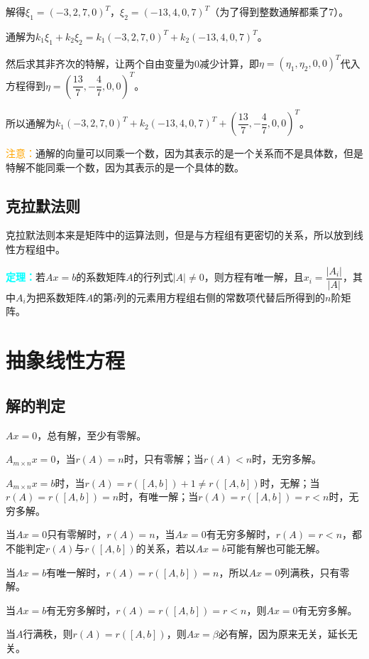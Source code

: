 \documentclass[UTF8, 12pt]{ctexart}
\begin{document}
解得$\xi_1=(-3,2,7,0)^T$，$\xi_2=(-13,4,0,7)^T$（为了得到整数通解都乘了7）。

通解为$k_1\xi_1+k_2\xi_2=k_1(-3,2,7,0)^T+k_2(-13,4,0,7)^T$。

然后求其非齐次的特解，让两个自由变量为0减少计算，即$\eta=(\eta_1,\eta_2,0,0)^T$代入方程得到$\eta=\left(\dfrac{13}{7},-\dfrac{4}{7},0,0\right)^T$。

所以通解为$k_1(-3,2,7,0)^T+k_2(-13,4,0,7)^T+\left(\dfrac{13}{7},-\dfrac{4}{7},0,0\right)^T$。

\textcolor{orange}{注意：}通解的向量可以同乘一个数，因为其表示的是一个关系而不是具体数，但是特解不能同乘一个数，因为其表示的是一个具体的数。

\subsection{克拉默法则}

克拉默法则本来是矩阵中的运算法则，但是与方程组有更密切的关系，所以放到线性方程组中。

\textcolor{aqua}{\textbf{定理：}}若$Ax=b$的系数矩阵$A$的行列式$\vert A\vert\neq0$，则方程有唯一解，且$x_i=\dfrac{\vert A_i\vert}{\vert A\vert}$，其中$A_i$为把系数矩阵$A$的第$i$列的元素用方程组右侧的常数项代替后所得到的$n$阶矩阵。

\section{抽象线性方程}

\subsection{解的判定}

$Ax=0$，总有解，至少有零解。

$A_{m\times n}x=0$，当$r(A)=n$时，只有零解；当$r(A)<n$时，无穷多解。

$A_{m\times n}x=b$时，当$r(A)=r([A,b])+1\neq r([A,b])$时，无解；当$r(A)=r([A,b])=n$时，有唯一解；当$r(A)=r([A,b])=r<n$时，无穷多解。

当$Ax=0$只有零解时，$r(A)=n$，当$Ax=0$有无穷多解时，$r(A)=r<n$，都不能判定$r(A)$与$r([A,b])$的关系，若以$Ax=b$可能有解也可能无解。

当$Ax=b$有唯一解时，$r(A)=r([A,b])=n$，所以$Ax=0$列满秩，只有零解。

当$Ax=b$有无穷多解时，$r(A)=r([A,b])=r<n$，则$Ax=0$有无穷多解。

当$A$行满秩，则$r(A)=r([A,b])$，则$Ax=\beta$必有解，因为原来无关，延长无关。
\end{document}
